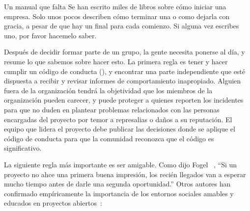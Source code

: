 \begin{aside}{Un manual que falta}
  Se han escrito miles de libros sobre cómo iniciar una empresa.
  Solo unos pocos describen cómo terminar una o como dejarla con gracia,
  a pesar de que hay un final para cada comienzo.
  Si alguna vez escribes uno,
  por favor hacemelo saber.
\end{aside}


Después de decidir formar parte de un grupo,
la gente necesita ponerse al día,
y \cite{Shol2019} resume lo que sabemos sobre hacer esto.
La primera regla es tener y hacer cumplir un código de conducta (),
y encontrar una parte independiente que esté dispuesta a recibir y revisar informes de comportamiento inapropiado.
Alguien fuera de la organización tendrá la objetividad que los miembros de la organización pueden carecer,
y puede proteger a quienes reporten los incidentes para que no duden en plantear problemas relacionados con las personas 
encargadas del proyecto por temor a represalias o daños a su reputación.
El equipo que lidera el proyecto debe publicar las decisiones donde se aplique el código de conducta
para que la comunidad reconozca que el código es significativo.

La siguiente regla más importante es ser amigable.
Como dijo Fogel ~\cite{Foge2005},
``Si un proyecto no ahce una primera buena impresión,
los recién llegados van a esperar mucho tiempo antes de darle una segunda oportunidad.''
Otros autores han confirmado empíricamente la importancia de los entornos sociales amables y educados
en proyectos abiertos~\cite{Sing2012,Stei2013,Stei2018}:

